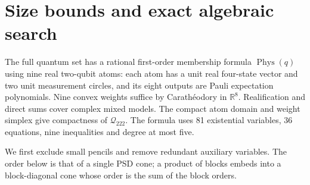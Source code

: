 \documentclass[11pt]{article}
\newcommand{\R}{\mathbb R}
\newcommand{\Q}{\mathcal Q_{222}}
\begin{document}
\section{Size bounds and exact algebraic search}
\label{sec:size-search}

The full quantum set has a rational first-order membership formula
$\operatorname{Phys}(q)$ using nine real two-qubit atoms: each atom has
a unit real four-state vector and two unit measurement circles, and its
eight outputs are Pauli expectation polynomials. Nine convex weights
suffice by Carath\'eodory in $\R^8$. Realification and direct sums cover
complex mixed models. The compact atom domain and weight simplex give
compactness of $\Q$. The formula uses 81 existential variables, 36
equations, nine inequalities and degree at most five.

We first exclude small pencils and remove redundant auxiliary variables.
The order below is that of a single PSD cone; a product of blocks embeds
into a block-diagonal cone whose order is the sum of the block orders.
\end{document}
